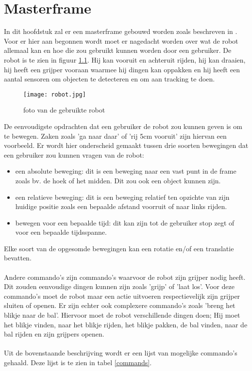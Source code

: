 
\chapter{Masterframe}
\label{cha:masterframe}

In dit hoofdstuk zal er een masterframe gebouwd worden zoals beschreven in \cite{Tessema}. Voor er hier aan begonnen wordt moet er nagedacht worden over wat de robot allemaal kan en hoe die zou gebruikt kunnen worden door een gebruiker. De robot is te zien in figuur \ref{robot}. Hij kan vooruit en achteruit rijden, hij kan draaien, hij heeft een grijper vooraan waarmee hij dingen kan oppakken en hij heeft een aantal sensoren om objecten te detecteren en om aan tracking te doen. \\

\begin{figure}[h]
\texttt{[image: robot.jpg]}
\label{robot}
\centering
\caption{foto van de gebruikte robot}
\end{figure}


De eenvoudigste opdrachten dat een gebruiker de robot zou kunnen geven is om te bewegen. Zaken zoals 'ga naar daar' of  'rij 5cm vooruit' zijn hiervan een voorbeeld. Er wordt hier onderscheid gemaakt tussen drie soorten bewegingen dat een gebruiker zou kunnen vragen van de robot:

\begin{itemize}
\item een absolute beweging: dit is een beweging naar een vast punt in de frame zoals bv. de hoek of het midden. Dit zou ook een object kunnen zijn.
\item een relatieve beweging: dit is een beweging relatief ten opzichte van zijn huidige positie zoals een bepaalde afstand voorruit of naar links rijden. 
\item bewegen voor een bepaalde tijd: dit kan zijn tot de gebruiker stop zegt of voor een bepaalde tijdsspanne.
\end{itemize}

Elke soort van de opgesomde bewegingen kan een rotatie en/of een translatie bevatten.  \\
\\
Andere commando's zijn commando's waarvoor de robot zijn grijper nodig heeft. Dit zouden eenvoudige dingen kunnen zijn zoals 'grijp' of 'laat los'. Voor deze commando's moet de robot maar een actie uitvoeren respectievelijk zijn grijper sluiten of openen. Er zijn echter ook complexere commando's zoals 'breng het blikje naar de bal'. Hiervoor moet de robot verschillende dingen doen; Hij moet het blikje vinden, naar het blikje rijden, het blikje pakken, de bal vinden, naar de bal rijden en zijn grijpers openen.\\
\\
Uit de bovenstaande beschrijving wordt er een lijst van mogelijke commando's gehaald. Deze lijst is te zien in tabel \ref{commands}.

